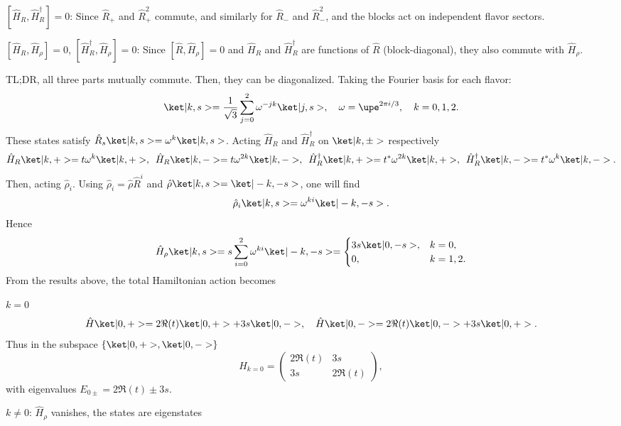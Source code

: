\begin{solution}
\begin{enumext}
\[    \]
    \begin{enumext}
      \item $[\hat H_R, \hat H_R^\dagger] = 0$: Since $\hat R_+$
      and $\hat R_+^2$ commute, and similarly for $\hat R_-$ and $\hat R_-^2$,
      and the blocks act on independent flavor sectors.
      \item $[\hat H_R, \hat H_\rho] = 0$,
      $[\hat H_R^\dagger, \hat H_\rho] = 0$: Since $[\hat R, \hat H_\rho] = 0$
      and $\hat H_R$ and $\hat H_R^\dagger$ are functions of $\hat R$
      (block-diagonal), they also commute with $\hat H_\rho$.
    \end{enumext}
    TL;DR, all three parts mutually commute. Then, they can be diagonalized.
    Taking the Fourier basis for each flavor:
    \[
      \ket|k, s> = \frac{1}{\sqrt3} \sum_{j=0}^2 \omega^{-jk} \ket|j, s>, \quad
      \omega = \upe^{2\pi i/3}, \quad k = 0,1,2.
    \]
    These states satisfy $\hat R_s \ket|k, s> = \omega^k \ket|k, s>$.
    Acting $\hat H_R$ and $\hat H_R^\dagger$ on $\ket|k, \pm>$ respectively
    \[
      \hat H_R \ket|k, +> = t \omega^k \ket|k, +>, \enspace
      \hat H_R \ket|k, -> = t \omega^{2k} \ket|k, ->, \enspace
      \hat H_R^\dagger \ket|k, +> = t^* \omega^{2k} \ket|k, +>, \enspace
      \hat H_R^\dagger \ket|k, -> = t^* \omega^{k} \ket|k, ->.
    \]
    Then, acting $\hat \rho_i$. Using $\hat \rho_i = \hat \rho \hat R^i$ and
    $\hat \rho \ket|k, s> = \ket|-k, -s>$, one will find
    \[
      \hat \rho_i \ket|k, s> = \omega^{k i} \ket|-k, -s>.
    \]
    Hence
    \[
      \hat H_\rho \ket|k, s> = s \sum_{i=0}^2 \omega^{k i} \ket|-k, -s> = 
      \begin{cases}
        3s \ket|0, -s>, & k = 0, \\
        0, & k = 1,2.
      \end{cases}
    \]
    From the results above, the total Hamiltonian action becomes\
    \begin{enumext}
      \item $k = 0$
      \[
        \hat H \ket|0, +> = 2\Re(t) \ket|0, +> + 3s \ket|0, ->,
        \quad
        \hat H \ket|0, -> = 2\Re(t) \ket|0, -> + 3s \ket|0, +>.
      \]
      Thus in the subspace $\{\ket|0, +>, \ket|0, ->\}$
      \[
        H_{k=0} = \begin{pmatrix}
          2\Re(t) & 3s \\
          3s & 2\Re(t)
        \end{pmatrix},
      \]
      with eigenvalues $E_{0\pm} = 2\Re(t) \pm 3s$.
      \item $k \neq 0$: $\hat H_\rho$ vanishes, the states are eigenstates

\end{enumext}
\end{enumext}
\end{solution}
